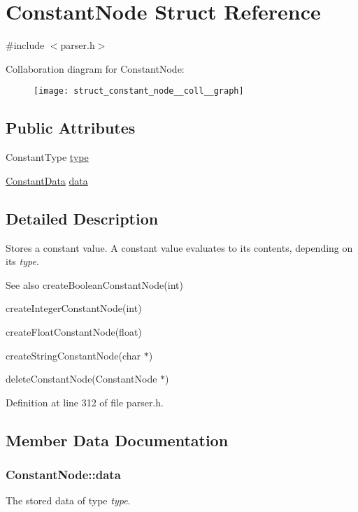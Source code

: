 \hypertarget{struct_constant_node}{\section{Constant\-Node Struct Reference}
\label{struct_constant_node}
}


{\ttfamily \#include $<$parser.\-h$>$}



Collaboration diagram for Constant\-Node\-:
\nopagebreak
\begin{figure}[H]
\begin{center}
\leavevmode
\texttt{[image: struct\_constant\_node\_\_coll\_\_graph]}
\end{center}
\end{figure}
\subsection*{Public Attributes}
\begin{DoxyCompactItemize}
\item 
Constant\-Type \hyperlink{struct_constant_node_ae0c5b58398f2ff9a476628ea34858893}{type}
\item 
\hyperlink{union_constant_data}{Constant\-Data} \hyperlink{struct_constant_node_ae546bb49962906e06a965381014ea7ae}{data}
\end{DoxyCompactItemize}


\subsection{Detailed Description}
Stores a constant value. A constant value evaluates to its contents, depending on its {\itshape type\/}.

\begin{DoxySeeAlso}{See also}
create\-Boolean\-Constant\-Node(int) 

create\-Integer\-Constant\-Node(int) 

create\-Float\-Constant\-Node(float) 

create\-String\-Constant\-Node(char $\ast$) 

delete\-Constant\-Node(\-Constant\-Node $\ast$) 
\end{DoxySeeAlso}


Definition at line 312 of file parser.\-h.



\subsection{Member Data Documentation}
\hypertarget{struct_constant_node_ae546bb49962906e06a965381014ea7ae}{
\subsubsection[{data}]{ {\bf Constant\-Node\-::data}}}\label{struct_constant_node_ae546bb49962906e06a965381014ea7ae}
The stored data of type {\itshape type\/}. 

